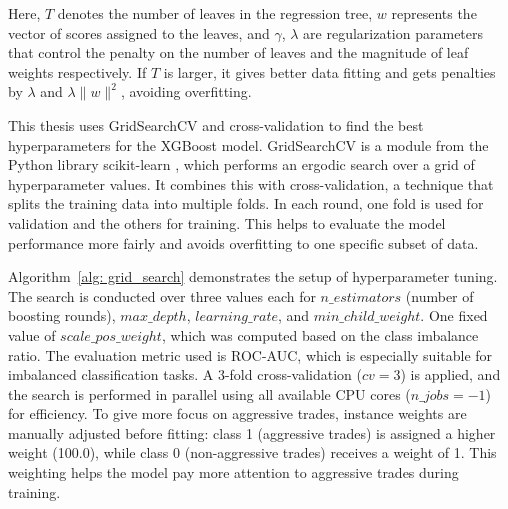 Here, $T$ denotes the number of leaves in the regression tree, $w$ represents the vector of scores assigned to the leaves, and $\gamma$, $\lambda$ are regularization parameters that control the penalty on the number of leaves and the magnitude of leaf weights respectively. If $T$ is larger, it gives better data fitting and gets penalties by $\lambda$ and $\lambda \|w\|^2$, avoiding overfitting.

This thesis uses GridSearchCV and cross-validation to find the best hyperparameters for the XGBoost model. GridSearchCV is a module from the Python library scikit-learn \citep{scikit-learn2011}, which performs an ergodic search over a grid of hyperparameter values. It combines this with cross-validation, a technique that splits the training data into multiple folds. In each round, one fold is used for validation and the others for training. This helps to evaluate the model performance more fairly and avoids overfitting to one specific subset of data. 

Algorithm~\ref{alg: grid_search} demonstrates the setup of hyperparameter tuning. The search is conducted over three values each for $n\_estimators$ (number of boosting rounds), $max\_depth$, $learning\_rate$, and $min\_child\_weight$. One fixed value of $scale\_pos\_weight$, which was computed based on the class imbalance ratio. The evaluation metric used is ROC-AUC, which is especially suitable for imbalanced classification tasks. A 3-fold cross-validation ($cv=3$) is applied, and the search is performed in parallel using all available CPU cores ($n\_jobs=-1$) for efficiency. To give more focus on aggressive trades, instance weights are manually adjusted before fitting: class 1 (aggressive trades) is assigned a higher weight (100.0), while class 0 (non-aggressive trades) receives a weight of 1. This weighting helps the model pay more attention to aggressive trades during training.

